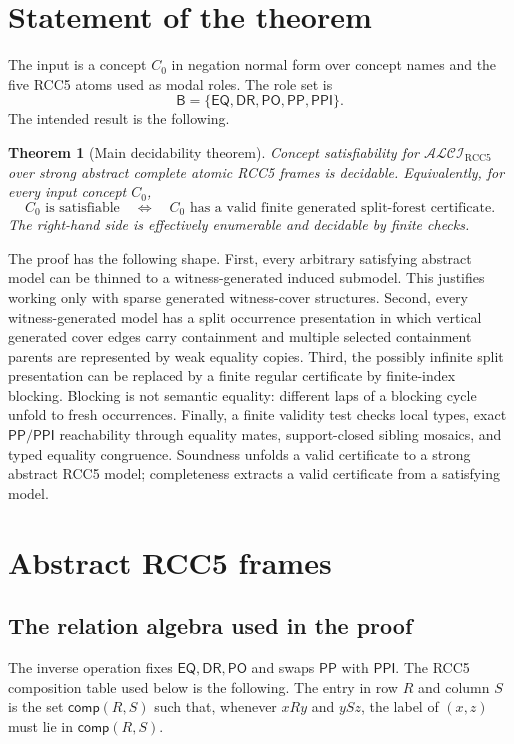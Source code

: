 \documentclass[11pt]{article}
\newtheorem{theorem}{Theorem}[section]
\newcommand{\Logic}{\mathcal{ALCI}_{\mathrm{RCC5}}}
\newcommand{\Base}{\mathsf{B}}
\newcommand{\EQ}{\mathsf{EQ}}
\newcommand{\DR}{\mathsf{DR}}
\newcommand{\PO}{\mathsf{PO}}
\newcommand{\PP}{\mathsf{PP}}
\newcommand{\PPI}{\mathsf{PPI}}
\newcommand{\comp}{\mathsf{comp}}
\begin{document}
\tableofcontents

\section{Statement of the theorem}

The input is a concept $C_0$ in negation normal form over concept names and the five RCC5 atoms used as modal roles.  The role set is
\[
  \Base=\{\EQ,\DR,\PO,\PP,\PPI\}.
\]
The intended result is the following.

\begin{theorem}[Main decidability theorem]\label{thm:main}
Concept satisfiability for $\Logic$ over strong abstract complete atomic RCC5 frames is decidable.
Equivalently, for every input concept $C_0$,
\[
  C_0 \text{ is satisfiable}
  \quad\Longleftrightarrow\quad
  C_0 \text{ has a valid finite generated split-forest certificate}.
\]
The right-hand side is effectively enumerable and decidable by finite checks.
\end{theorem}

The proof has the following shape.  First, every arbitrary satisfying abstract model can be thinned to a witness-generated induced submodel.  This justifies working only with sparse generated witness-cover structures.  Second, every witness-generated model has a split occurrence presentation in which vertical generated cover edges carry containment and multiple selected containment parents are represented by weak equality copies.  Third, the possibly infinite split presentation can be replaced by a finite regular certificate by finite-index blocking.  Blocking is not semantic equality: different laps of a blocking cycle unfold to fresh occurrences.  Finally, a finite validity test checks local types, exact $\PP/\PPI$ reachability through equality mates, support-closed sibling mosaics, and typed equality congruence.  Soundness unfolds a valid certificate to a strong abstract RCC5 model; completeness extracts a valid certificate from a satisfying model.

\section{Abstract RCC5 frames}

\subsection{The relation algebra used in the proof}

The inverse operation fixes $\EQ,\DR,\PO$ and swaps $\PP$ with $\PPI$.  The RCC5 composition table used below is the following.  The entry in row $R$ and column $S$ is the set $\comp(R,S)$ such that, whenever $xRy$ and $ySz$, the label of $(x,z)$ must lie in $\comp(R,S)$.
\end{document}
